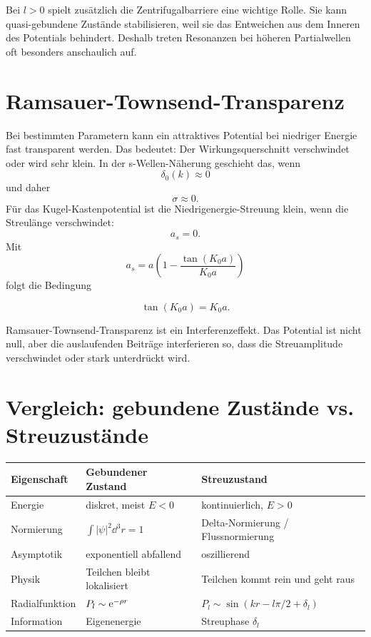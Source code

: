 \begin{notebox}
Bei \(l>0\) spielt zusätzlich die Zentrifugalbarriere eine wichtige Rolle. Sie kann quasi-gebundene Zustände stabilisieren, weil sie das Entweichen aus dem Inneren des Potentials behindert. Deshalb treten Resonanzen bei höheren Partialwellen oft besonders anschaulich auf.
\end{notebox}

\section{Ramsauer-Townsend-Transparenz}

Bei bestimmten Parametern kann ein attraktives Potential bei niedriger Energie fast transparent werden. Das bedeutet: Der Wirkungsquerschnitt verschwindet oder wird sehr klein. In der s-Wellen-Näherung geschieht das, wenn
\[
    \delta_0(k)\approx0
\]
und daher
\[
    \sigma\approx0.
\]
Für das Kugel-Kastenpotential ist die Niedrigenergie-Streuung klein, wenn die Streulänge verschwindet:
\[
    a_s=0.
\]
Mit
\[
    a_s=a\left(1-\frac{\tan(K_0a)}{K_0a}\right)
\]
folgt die Bedingung
\begin{formulabox}
\[
    \tan(K_0a)=K_0a.
\]
\end{formulabox}

\begin{conceptbox}
Ramsauer-Townsend-Transparenz ist ein Interferenzeffekt. Das Potential ist nicht null, aber die auslaufenden Beiträge interferieren so, dass die Streuamplitude verschwindet oder stark unterdrückt wird.
\end{conceptbox}

\section{Vergleich: gebundene Zustände vs. Streuzustände}

\begin{center}
\begin{tabular}{lll}
\toprule
Eigenschaft & Gebundener Zustand & Streuzustand \\
\midrule
Energie & diskret, meist \(E<0\) & kontinuierlich, \(E>0\) \\
Normierung & \(\int |\psi|^2\dd^3r=1\) & Delta-Normierung / Flussnormierung \\
Asymptotik & exponentiell abfallend & oszillierend \\
Physik & Teilchen bleibt lokalisiert & Teilchen kommt rein und geht raus \\
Radialfunktion & \(P_l\sim \mathrm{e}^{-\rho r}\) & \(P_l\sim \sin(kr-l\pi/2+\delta_l)\) \\
Information & Eigenenergie & Streuphase \(\delta_l\) \\
\bottomrule
\end{tabular}
\end{center}

